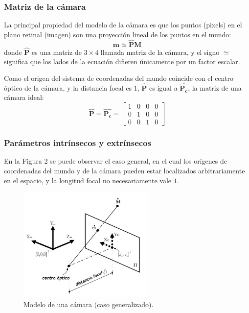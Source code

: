 \documentclass[11pt,a4paper,titlepage]{article}
\newcommand{\Two}[1]{\ensuremath{\mathbf{#1}}}
\newcommand{\Three}[1]{\ensuremath{\mathbf{#1}}}
\newcommand{\Mat}[1]{\ensuremath{\mathbf{\hat{#1}}}}
\newcommand{\Figure}[1]{Figura #1}
\begin{document}
\subsubsection{Matriz de la cámara}

La principal propiedad del modelo de la cámara es que los puntos (pixels) en el plano retinal (imagen) son una proyección lineal de los puntos en el mundo:
\[
	\Two{m} \simeq \Mat{P}\Three{M}
\]
donde \Mat{P} es una matriz de $3 \times 4$ llamada matriz de la cámara, y el signo $\simeq$ significa que los lados de la ecuación difieren únicamente por un factor escalar.

Como el origen del sistema de coordenadas del mundo coincide con el centro óptico de la cámara, y la distancia focal es $1$, \Mat{P} es igual a $\Mat{P_c}$, la matriz de una cámara ideal:
\[
	\Mat{P} = \Mat{P_c} =
	\begin{bmatrix}
		1 & 0 & 0 & 0 \\ 
		0 & 1 & 0 & 0 \\ 
		0 & 0 & 1 & 0
	\end{bmatrix}
\]

\subsubsection{Parámetros intrínsecos y extrínsecos}

En la \Figure{2} se puede observar el caso general, en el cual los orígenes de coordenadas del mundo y de la cámara pueden estar localizados arbitrariamente en el espacio, y la longitud focal no necesariamente vale $1$.


\begin{figure}[h!]

  \centering
    \includegraphics[width=0.6\textwidth]{f2.png}
  \caption{Modelo de una cámara (caso generalizado).}
\end{figure}
\end{document}
